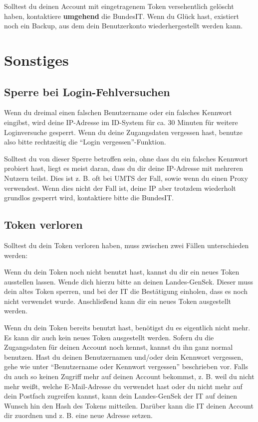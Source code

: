 \documentclass[parskip=half]{scrartcl}
\begin{document}
Solltest du deinen Account mit eingetragenem Token versehentlich gelöscht haben, kontaktiere \textbf{umgehend} die BundesIT.
Wenn du Glück hast, existiert noch ein Backup, aus dem dein Benutzerkonto wiederhergestellt werden kann.


\newpage
\section{Sonstiges}
\subsection{Sperre bei Login-Fehlversuchen}
Wenn du dreimal einen falschen Benutzername oder ein falsches Kennwort eingibst,
wird deine IP-Adresse im ID-System für ca. 30 Minuten für weitere Loginversuche gesperrt.
Wenn du deine Zugangsdaten vergessen hast, benutze also bitte rechtzeitig die "`Login vergessen"'-Funktion.

Solltest du von dieser Sperre betroffen sein, ohne dass du ein falsches Kennwort probiert hast,
liegt es meist daran, dass du dir deine IP-Adresse mit mehreren Nutzern teilst.
Dies ist z. B. oft bei UMTS der Fall, sowie wenn du einen Proxy verwendest.
Wenn dies nicht der Fall ist, deine IP aber trotzdem wiederholt grundlos gesperrt wird,
kontaktiere bitte die BundesIT.

\subsection{Token verloren}
Solltest du dein Token verloren haben, muss zwischen zwei Fällen unterschieden werden:

Wenn du dein Token noch nicht benutzt hast, kannst du dir ein neues Token ausstellen lassen.
Wende dich hierzu bitte an deinen Landes-GenSek. Dieser muss dein altes Token sperren,
und bei der IT die Bestätigung einholen, dass es noch nicht verwendet wurde.
Anschließend kann dir ein neues Token ausgestellt werden.

Wenn du dein Token bereits benutzt hast, benötigst du es eigentlich nicht mehr.
Es kann dir auch kein neues Token ausgestellt werden.
Sofern du die Zugangsdaten für deinen Account noch kennst, kannst du ihn ganz normal benutzen.
Hast du deinen Benutzernamen und/oder dein Kennwort vergessen, gehe wie unter "`Benutzername oder Kennwort vergessen"' beschrieben vor.
Falls du auch so keinen Zugriff mehr auf deinen Account bekommst,
z. B. weil du nicht mehr weißt, welche E-Mail-Adresse du verwendet hast oder du nicht mehr auf dein Postfach zugreifen kannst,
kann dein Landes-GenSek der IT auf deinen Wunsch hin den Hash des Tokens mitteilen.
Darüber kann die IT deinen Account dir zuordnen und z. B. eine neue Adresse setzen.
\end{document}
